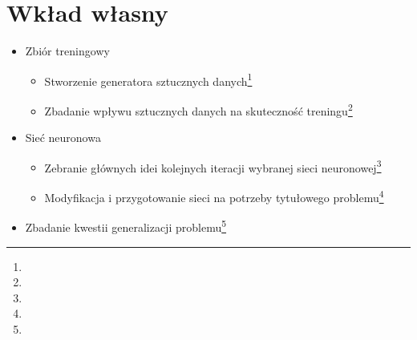 \section{Wkład własny}

\begin{itemize}
	\item Zbiór treningowy
		\begin{itemize}
			\item Stworzenie generatora sztucznych danych\footnote{}
			\item Zbadanie wpływu sztucznych danych na skuteczność treningu\footnote{}
		\end{itemize}
	\item Sieć neuronowa
	\begin{itemize}
		\item Zebranie głównych idei kolejnych iteracji wybranej sieci neuronowej\footnote{}
		\item Modyfikacja i przygotowanie sieci na potrzeby tytułowego problemu\footnote{}
	\end{itemize}
	\item Zbadanie kwestii generalizacji problemu\footnote{}
\end{itemize}
